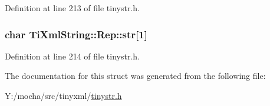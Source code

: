 Definition at line 213 of file tinystr.h.

\hypertarget{struct_ti_xml_string_1_1_rep_a88a7037a489827ec9e59b008e11342b0}{
\subsubsection[{str}]{\setlength{\rightskip}{0pt plus 5cm}char {\bf TiXmlString::Rep::str}\mbox{[}1\mbox{]}}}
\label{struct_ti_xml_string_1_1_rep_a88a7037a489827ec9e59b008e11342b0}


Definition at line 214 of file tinystr.h.



The documentation for this struct was generated from the following file:\begin{DoxyCompactItemize}
\item 
Y:/mocha/src/tinyxml/\hyperlink{tinystr_8h}{tinystr.h}\end{DoxyCompactItemize}
